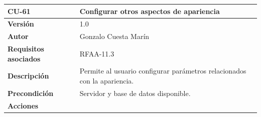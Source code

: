 \documentclass[
]{article}
\begin{document}
\begin{longtable}[]{@{}ll@{}}
\toprule
\begin{minipage}[b]{0.22\columnwidth}\raggedright
\textbf{CU-61}\strut
\end{minipage} & \begin{minipage}[b]{0.72\columnwidth}\raggedright
\textbf{Configurar otros aspectos de apariencia}\strut
\end{minipage}\tabularnewline
\midrule
\endhead
\begin{minipage}[t]{0.22\columnwidth}\raggedright
\textbf{Versión}\strut
\end{minipage} & \begin{minipage}[t]{0.72\columnwidth}\raggedright
1.0\strut
\end{minipage}\tabularnewline
\begin{minipage}[t]{0.22\columnwidth}\raggedright
\textbf{Autor}\strut
\end{minipage} & \begin{minipage}[t]{0.72\columnwidth}\raggedright
Gonzalo Cuesta Marín\strut
\end{minipage}\tabularnewline
\begin{minipage}[t]{0.22\columnwidth}\raggedright
\textbf{Requisitos asociados}\strut
\end{minipage} & \begin{minipage}[t]{0.72\columnwidth}\raggedright
RFAA-11.3\strut
\end{minipage}\tabularnewline
\begin{minipage}[t]{0.22\columnwidth}\raggedright
\textbf{Descripción}\strut
\end{minipage} & \begin{minipage}[t]{0.72\columnwidth}\raggedright
Permite al usuario configurar parámetros relacionados con la
apariencia.\strut
\end{minipage}\tabularnewline
\begin{minipage}[t]{0.22\columnwidth}\raggedright
\textbf{Precondición}\strut
\end{minipage} & \begin{minipage}[t]{0.72\columnwidth}\raggedright
Servidor y base de datos disponible.\strut
\end{minipage}\tabularnewline
\begin{minipage}[t]{0.22\columnwidth}\raggedright
\textbf{Acciones}\strut
\end{minipage} & \begin{minipage}[t]{0.72\columnwidth}\raggedright
\begin{enumerate}

\end{enumerate}
\end{minipage}
\end{longtable}
\end{document}

